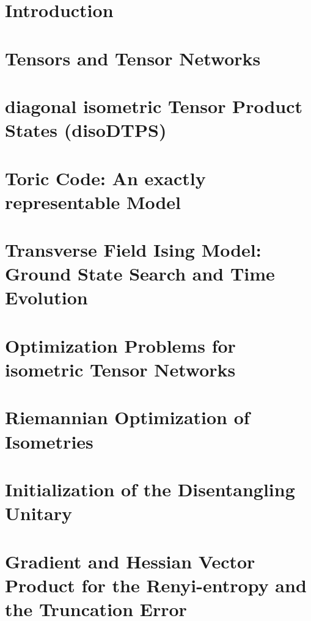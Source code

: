 \documentclass[encoding=utf8,british]{template/thesis}
\begin{document}
	\chapter{Introduction}
	
	\chapter{Tensors and Tensor Networks}
	
	
	\chapter{diagonal isometric Tensor Product States (disoDTPS)}
	
	
	\chapter{Toric Code: An exactly representable Model}
	
	
	\chapter{Transverse Field Ising Model: Ground State Search and Time Evolution}
	
	
	\appendix
	
	\chapter{Optimization Problems for isometric Tensor Networks}
	\label{app:optimization_problems_for_isometric_tensor_networks}
	
	
	\chapter{Riemannian Optimization of Isometries}
	\label{app:riemannian_optimization_of_isometries}
	
	
	\chapter{Initialization of the Disentangling Unitary}
	
	\chapter{Gradient and Hessian Vector Product for the Renyi-entropy and the Truncation Error}
	\label{app:computation_of_gradient_and_hvp_for_riemannian_optimization}
	
	
	
	\backmatter
	\printbibliography
	
\end{document}
